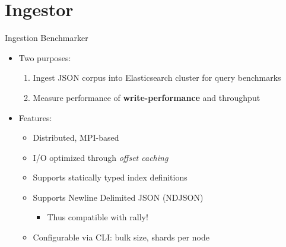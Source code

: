 \documentclass[compress,aspectratio=169]{beamer}
\begin{document}
	\section{Ingestor}
	\begin{frame}{Ingestion Benchmarker}
    \begin{itemize}
      \item Two purposes:
        \begin{enumerate}
          \item Ingest JSON corpus into Elasticsearch cluster for query benchmarks
          \item Measure performance of \textbf{write-performance} and throughput
        \end{enumerate}
      \item Features:
        \begin{itemize}
          \item Distributed, MPI-based
          \item I/O optimized through \emph{offset caching}
          \item Supports statically typed index definitions
          \item Supports Newline Delimited JSON (NDJSON)
            \begin{itemize}
              \item Thus compatible with rally!
            \end{itemize}
          \item Configurable via CLI: bulk size, shards per node
        \end{itemize}
    \end{itemize}
	\end{frame}
\end{document}
